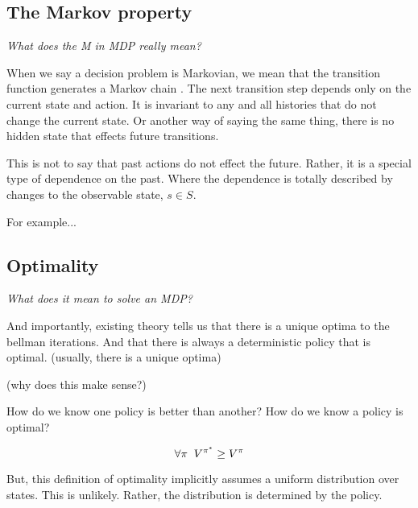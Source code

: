 \hypertarget{the-markov-property}{%
\subsection{The Markov property}\label{the-markov-property}}

\begin{displayquote}
  \textit{What does the M in MDP really mean?}
\end{displayquote}

When we say a decision problem is Markovian, we mean that the transition
function generates a Markov chain \cite{Markov2006}. The next transition step depends only
on the current state and action. It is invariant to any and all histories that do not
change the current state. Or another way of saying the same thing, there is no hidden state
that effects future transitions.

This is not to say that past actions do not effect the future. Rather,
it is a special type of dependence on the past. Where the dependence is
totally described by changes to the observable state, $s\in S$.

{\color{red}For example...}


\hypertarget{optimality}{%
\subsection{\color{red}Optimality}\label{optimality}}



\begin{displayquote}
  \textit{What does it mean to solve an MDP?}
\end{displayquote}

And importantly, existing theory tells us that there is a unique optima to the bellman iterations.
And that there is always a deterministic policy that is optimal. (usually, there is a unique optima)

(why does this make sense?)


How do we know one policy is better than another? How do we know a
policy is optimal?

\[
\forall \pi\;\; V^{\pi^* } \ge V^{\pi} \\
\]

But, this definition of optimality implicitly assumes a uniform
distribution over states. This is unlikely. Rather, the distribution is
determined by the policy.

